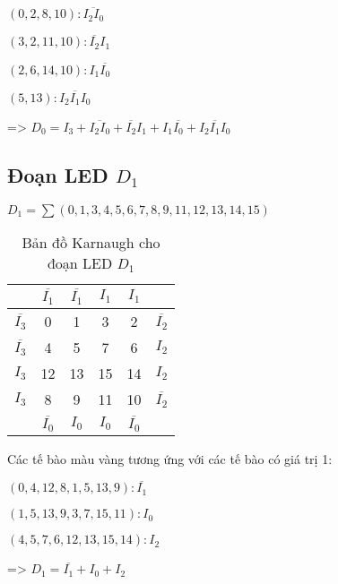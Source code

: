 \((0,2,8,10): \overline{I_2 I_0} \)

\((3,2,11,10): \overline{I_2} I_1\)

\((2,6,14,10): I_1 \overline{I_0}\)

\((5,13): I_2 \overline{I_1} I_0\)

=> \(D_0 = I_3 + \overline{I_2 I_0} + \overline{I_2} I_1 + I_1 \overline{I_0} + I_2 \overline{I_1} I_0\)

\subsection{Đoạn LED \texorpdfstring{$D_1$}{D1}}

\(D_1 = \sum(0,1,3,4,5,6,7,8,9,11,12,13,14,15)\)

\begin{table}[H]
	\centering
	\begin{tabular}{|c|c|c|c|c|c|}
		\hline
		                   & \(\overline{I_1}\)   & \(\overline{I_1}\)   & \(I_1\)              & \(I_1\)              &                    \\
		\hline
		\(\overline{I_3}\) & \cellcolor{yellow}0  & \cellcolor{yellow}1  & \cellcolor{yellow}3  & 2                    & \(\overline{I_2}\) \\
		\hline
		\(\overline{I_3}\) & \cellcolor{yellow}4  & \cellcolor{yellow}5  & \cellcolor{yellow}7  & \cellcolor{yellow}6  & \(I_2\)            \\
		\hline
		\(I_3\)            & \cellcolor{yellow}12 & \cellcolor{yellow}13 & \cellcolor{yellow}15 & \cellcolor{yellow}14 & \(I_2\)            \\
		\hline
		\(I_3\)            & \cellcolor{yellow}8  & \cellcolor{yellow}9  & \cellcolor{yellow}11 & 10                   & \(\overline{I_2}\) \\
		\hline
		                   & \(\overline{I_0}\)   & \(I_0\)              & \(I_0\)              & \(\overline{I_0}\)   &                    \\
		\hline
	\end{tabular}
	\caption*{Bản đồ Karnaugh cho đoạn LED \(D_1\)}
\end{table}

Các tế bào màu vàng tương ứng với các tế bào có giá trị 1:

\((0,4,12,8,1,5,13,9): \overline{I_1}\)

\((1,5,13,9,3,7,15,11): I_0\)

\((4,5,7,6,12,13,15,14): I_2\)

=> \(D_1 = \overline{I_1} + I_0 + I_2\)

